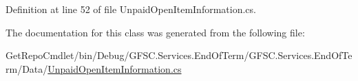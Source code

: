 Definition at line 52 of file Unpaid\+Open\+Item\+Information.\+cs.



The documentation for this class was generated from the following file\+:\begin{DoxyCompactItemize}
\item 
Get\+Repo\+Cmdlet/bin/\+Debug/\+G\+F\+S\+C.\+Services.\+End\+Of\+Term/\+G\+F\+S\+C.\+Services.\+End\+Of\+Term/\+Data/\mbox{\hyperlink{_unpaid_open_item_information_8cs}{Unpaid\+Open\+Item\+Information.\+cs}}\end{DoxyCompactItemize}
